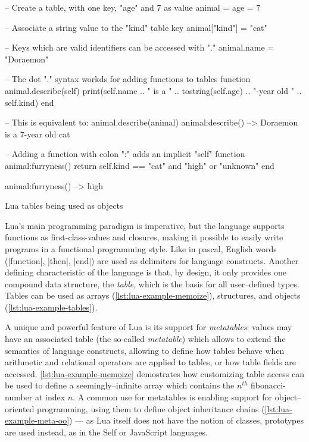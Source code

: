\begin{listing}[H]
  \begin{luacode}
    -- Create a table, with one key, "age" and 7 as value
    animal = { age = 7 }

    -- Associate a string value to the "kind" table key
    animal["kind"] = "cat"

    -- Keys which are valid identifiers can be accessed with "."
    animal.name = "Doraemon"

    -- The dot "." syntax workds for adding functions to tables
    function animal.describe(self)
      print(self.name .. " is a " .. tostring(self.age) ..
            "-year old " .. self.kind)
    end

    -- This is equivalent to: animal.describe(animal)
    animal:describe()  --> Doraemon is a 7-year old cat

    -- Adding a function with colon ":" adds an implicit "self"
    function animal:furryness()
      return self.kind == "cat" and "high" or "unknown"
    end

    animal:furryness()  --> high
  \end{luacode}
	\caption{Lua tables being used as objects}
  \label{lst:lua-example-tables}
\end{listing}

Lua's main programming paradigm is imperative, but the language supports
functions as \glspl{first-class-value} and \glspl{closure}, making it possible
to easily write programs in a functional programming style. Like in
\gls{pascal}, English words (\Mlua|function|, \Mlua|then|, \Mlua|end|) are
used as delimiters for language constructs. Another defining characteristic of
the language is that, by design, it only provides one compound data structure,
the \emph{table}, which is the basis for all user--defined types. Tables can
be used as arrays (\autoref{lst:lua-example-memoize}), structures, and
objects (\autoref{lst:lua-example-tables}).

A unique and powerful feature of Lua is its support for \emph{metatables}:
values may have an associated table (the so-called \emph{metatable}) which
allows to extend the semantics of language constructs, allowing to define how
tables behave when arithmetic and relational operators are applied to tables,
or how table fields are accessed. \autoref{lst:lua-example-memoize}
demostrates how customizing table access can be used to define a
seemingly--infinite array which contains the $n^{th}$ \gls{fibonacci-number}
at index $n$. A common use for metatables is enabling support for
object--oriented programming, using them to define object inheritance chains
(\autoref{lst:lua-example-meta-oo}) --- as Lua itself does not have the
notion of classes, prototypes are used instead, as in the Self or JavaScript
languages.

